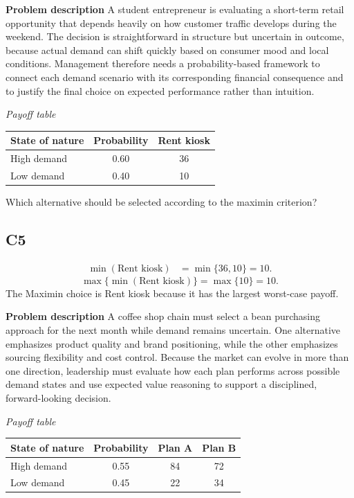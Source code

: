 	\begin{ExamProblems}
		\item
		\textbf{Problem description}
		A student entrepreneur is evaluating a short-term retail opportunity that depends heavily on how customer traffic develops during the weekend. The decision is straightforward in structure but uncertain in outcome, because actual demand can shift quickly based on consumer mood and local conditions. Management therefore needs a probability-based framework to connect each demand scenario with its corresponding financial consequence and to justify the final choice on expected performance rather than intuition.

		\begin{center}
			\textit{Payoff table} \par
			\begin{tabular}{l c c}
				\toprule
				State of nature & Probability & Rent kiosk \\
				\midrule
				High demand & 0.60 & 36 \\
				Low demand & 0.40 & 10 \\
				\bottomrule
			\end{tabular}
		\end{center}

		Which alternative should be selected according to the maximin criterion?

		\subsection*{C5}
			\[
			\begin{aligned}
			\min(\text{Rent kiosk}) &= \min\{36,10\} = 10.
			\end{aligned}
			\]
			\[
			\max\{\min(\text{Rent kiosk})\}
			= \max\{10\}
			= 10.
			\]
			The Maximin choice is Rent kiosk because it has the largest worst-case payoff.
		\item
		\textbf{Problem description}
		A coffee shop chain must select a bean purchasing approach for the next month while demand remains uncertain. One alternative emphasizes product quality and brand positioning, while the other emphasizes sourcing flexibility and cost control. Because the market can evolve in more than one direction, leadership must evaluate how each plan performs across possible demand states and use expected value reasoning to support a disciplined, forward-looking decision.

		\begin{center}
			\textit{Payoff table} \par
			\begin{tabular}{l c c c}
				\toprule
				State of nature & Probability & Plan A & Plan B \\
				\midrule
				High demand & 0.55 & 84 & 72 \\
				Low demand & 0.45 & 22 & 34 \\
				\bottomrule
			\end{tabular}
		\end{center}


\end{ExamProblems}

